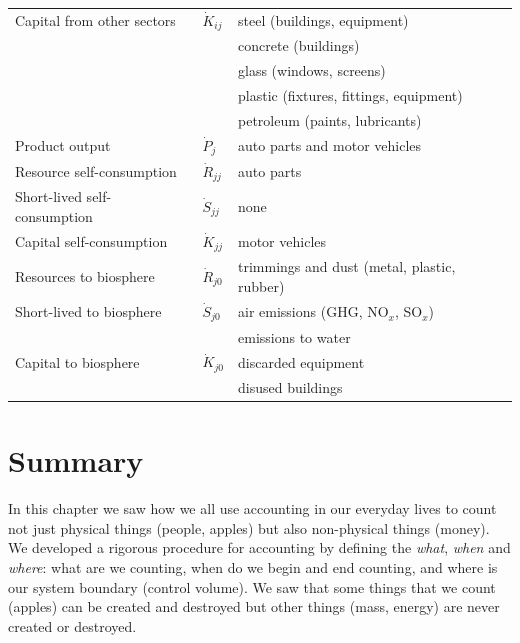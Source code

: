 \begin{table}
\begin{center}
\begin{tabular}{p{4cm}p{1cm}p{5.2cm}}
Capital from other sectors		& $\dot{K}_{ij}$		&	 steel (buildings, equipment)					\\
												&								&	 concrete (buildings)								\\
												&								&	 	glass (windows, screens)						\\
												&								&	 plastic (fixtures, fittings, equipment)		\\
												&								&	 	petroleum (paints, lubricants)				\\
\midrule
Product output							&	$\dot{P}_{j}$		&	auto parts and motor vehicles					\\[0.15cm]
\midrule
Resource self-consumption		&	$\dot{R}_{jj}$		&	auto parts												\\[0.15cm]
Short-lived self-consumption   &	$\dot{S}_{jj}$		&	none 														\\[0.15cm]
Capital self-consumption			&	$\dot{K}_{jj}$		&	motor vehicles											\\[0.15cm]
\midrule
Resources to biosphere			& $\dot{R}_{j0}$		&	trimmings and dust (metal, plastic, rubber)	\\[0.15cm]
Short-lived to biosphere			& $\dot{S}_{j0}$		&	air emissions (GHG, NO$_x$, SO$_x$)		\\
												&								& emissions to water									\\[0.15cm]
Capital to biosphere					& $\dot{K}_{j0}$	&	discarded equipment								\\
												&								& disused buildings										\\
\bottomrule
\end{tabular}
\end{center}
\label{tab:materials_auto}
\end{table}


\section{Summary}
\label{sec:materials_summary}

In this chapter we saw how we all use accounting in our everyday lives
to count not just physical things (people, apples) but also non-physical things
(money). We developed a rigorous procedure for accounting by defining the 
\emph{what}, \emph{when} and \emph{where}: what are we counting,
when do we begin and end counting,
and where is our system boundary (control volume). 
We saw that some things that we count (apples) can be
created and destroyed but other things (mass, energy)
are never created or destroyed.

